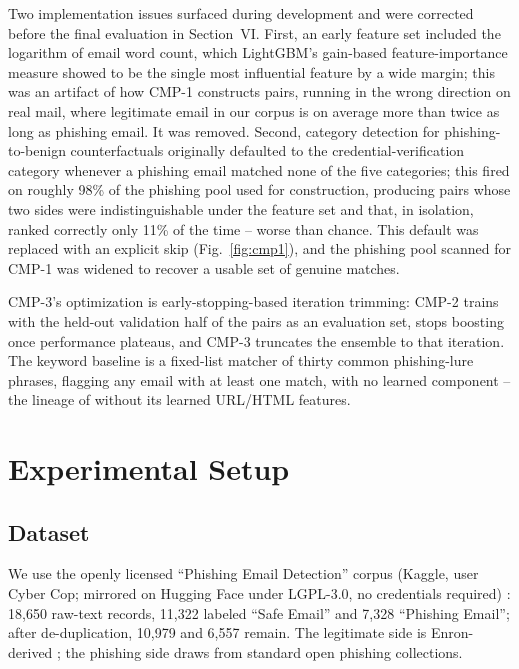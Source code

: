 \documentclass[conference]{IEEEtran}
\begin{document}
Two implementation issues surfaced during development and were corrected before the final evaluation in Section~VI. First, an early feature set included the logarithm of email word count, which LightGBM's gain-based feature-importance measure showed to be the single most influential feature by a wide margin; this was an artifact of how CMP-1 constructs pairs, running in the wrong direction on real mail, where legitimate email in our corpus is on average more than twice as long as phishing email. It was removed. Second, category detection for phishing-to-benign counterfactuals originally defaulted to the credential-verification category whenever a phishing email matched none of the five categories; this fired on roughly 98\% of the phishing pool used for construction, producing pairs whose two sides were indistinguishable under the feature set and that, in isolation, ranked correctly only 11\% of the time -- worse than chance. This default was replaced with an explicit skip (Fig.~\ref{fig:cmp1}), and the phishing pool scanned for CMP-1 was widened to recover a usable set of genuine matches.

CMP-3's optimization is early-stopping-based iteration trimming: CMP-2 trains with the held-out validation half of the pairs as an evaluation set, stops boosting once performance plateaus, and CMP-3 truncates the ensemble to that iteration. The keyword baseline is a fixed-list matcher of thirty common phishing-lure phrases, flagging any email with at least one match, with no learned component -- the lineage of \cite{fette2007pilfer} without its learned URL/HTML features.

\section{Experimental Setup}

\subsection{Dataset}

We use the openly licensed ``Phishing Email Detection'' corpus (Kaggle, user Cyber Cop; mirrored on Hugging Face under LGPL-3.0, no credentials required) \cite{phishingkaggle2023}: 18{,}650 raw-text records, 11{,}322 labeled ``Safe Email'' and 7{,}328 ``Phishing Email''; after de-duplication, 10{,}979 and 6{,}557 remain. The legitimate side is Enron-derived \cite{klimt2004enron,metsis2006enronspam}; the phishing side draws from standard open phishing collections.
\end{document}
